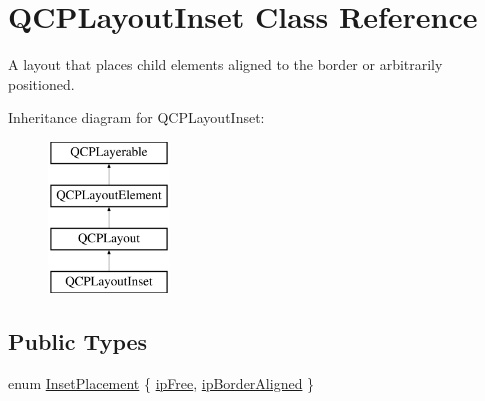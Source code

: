 \hypertarget{classQCPLayoutInset}{\section{\-Q\-C\-P\-Layout\-Inset \-Class \-Reference}
\label{classQCPLayoutInset}
}


\-A layout that places child elements aligned to the border or arbitrarily positioned.  


\-Inheritance diagram for \-Q\-C\-P\-Layout\-Inset\-:\begin{figure}[H]
\begin{center}
\leavevmode
\includegraphics[height=4.000000cm]{classQCPLayoutInset}
\end{center}
\end{figure}
\subsection*{\-Public \-Types}
\begin{DoxyCompactItemize}
\item 
enum \hyperlink{classQCPLayoutInset_a8b9e17d9a2768293d2a7d72f5e298192}{\-Inset\-Placement} \{ \hyperlink{classQCPLayoutInset_a8b9e17d9a2768293d2a7d72f5e298192aa4802986ea2cea457f932b115acba59e}{ip\-Free}, 
\hyperlink{classQCPLayoutInset_a8b9e17d9a2768293d2a7d72f5e298192aa81e7df4a785ddee2229a8f47c46e817}{ip\-Border\-Aligned}
 \}
\end{DoxyCompactItemize}
